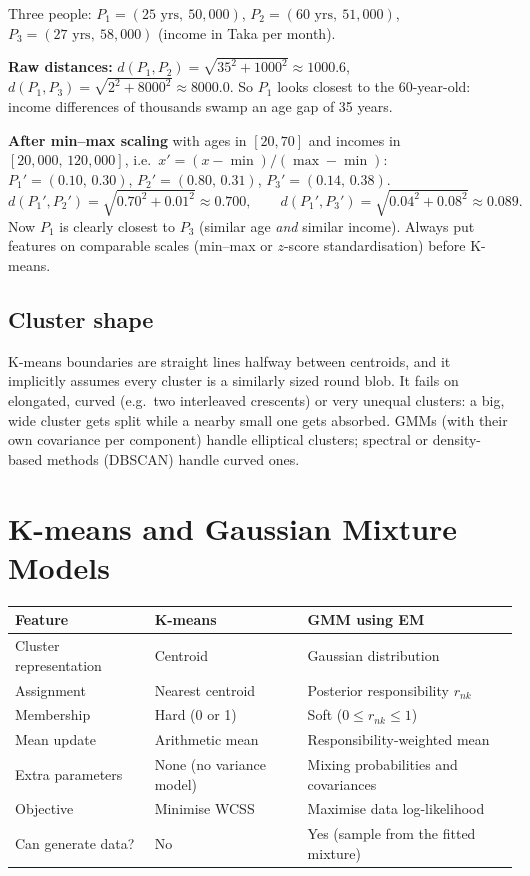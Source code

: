 \documentclass[11pt,a4paper]{article}
\begin{document}
\begin{example}
Three people: $P_1=(25\text{ yrs},\ 50{,}000)$, $P_2=(60\text{ yrs},\ 51{,}000)$, $P_3=(27\text{ yrs},\ 58{,}000)$ (income in Taka per month).

\textbf{Raw distances:}
$d(P_1,P_2)=\sqrt{35^2+1000^2}\approx1000.6$, \quad $d(P_1,P_3)=\sqrt{2^2+8000^2}\approx8000.0$.
So $P_1$ looks closest to the 60-year-old: income differences of thousands swamp an age gap of 35 years.

\textbf{After min--max scaling} with ages in $[20,70]$ and incomes in $[20{,}000,\,120{,}000]$, i.e.\ $x'=(x-\min)/(\max-\min)$:
$P_1'=(0.10,\,0.30)$, $P_2'=(0.80,\,0.31)$, $P_3'=(0.14,\,0.38)$.
\[
d(P_1',P_2')=\sqrt{0.70^2+0.01^2}\approx0.700,\qquad d(P_1',P_3')=\sqrt{0.04^2+0.08^2}\approx0.089.
\]
Now $P_1$ is clearly closest to $P_3$ (similar age \emph{and} similar income). Always put features on comparable scales (min--max or $z$-score standardisation) before K-means.
\end{example}

\subsection{Cluster shape}

K-means boundaries are straight lines halfway between centroids, and it implicitly assumes every cluster is a similarly sized round blob. It fails on elongated, curved (e.g.\ two interleaved crescents) or very unequal clusters: a big, wide cluster gets split while a nearby small one gets absorbed. GMMs (with their own covariance per component) handle elliptical clusters; spectral or density-based methods (DBSCAN) handle curved ones.

\section{K-means and Gaussian Mixture Models}\label{sec:gmm}

\begin{center}
\renewcommand{\arraystretch}{1.15}
\begin{tabular}{@{}p{3.6cm}p{5cm}p{5.8cm}@{}}
\toprule
Feature & K-means & GMM using EM\\
\midrule
Cluster representation & Centroid & Gaussian distribution\\
Assignment & Nearest centroid & Posterior responsibility $r_{nk}$\\
Membership & Hard (0 or 1) & Soft ($0\le r_{nk}\le1$)\\
Mean update & Arithmetic mean & Responsibility-weighted mean\\
Extra parameters & None (no variance model) & Mixing probabilities and covariances\\
Objective & Minimise WCSS & Maximise data log-likelihood\\
Can generate data? & No & Yes (sample from the fitted mixture)\\
\bottomrule
\end{tabular}
\end{center}
\end{document}

